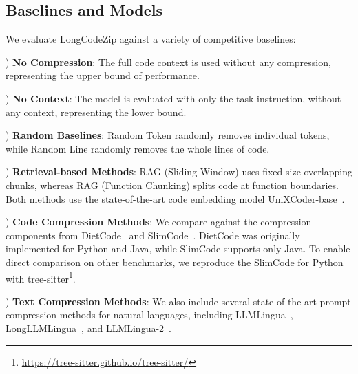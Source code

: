 \documentclass[10pt,conference]{IEEEtran}
\newcommand{\todo}[1]{{\textcolor{cyan}{\textbf{[TODO: #1]}}}}
\newcommand{\todoc}[2]{{\textcolor{#1}{\textbf{[#2]}}}}
\newcommand{\shi}[1]{\todoc{orange}{Shi: #1}}
\newcommand{\qian}[1]{\todoc{violet}{Qian: #1}}
\newcommand{\hy}[1]{\todoc{red}{HY: #1}}
\newcommand{\approach}{{LongCodeZip}\xspace} %
\begin{document}



\subsection{Baselines and Models}

We evaluate \approach against a variety of competitive baselines: 

) \textbf{No Compression}: The full code context is used without any compression, representing the upper bound of performance. 

) \textbf{No Context}: The model is evaluated with only the task instruction, without any context, representing the lower bound. 

) \textbf{Random Baselines}: Random Token randomly removes individual tokens, while Random Line randomly removes the whole lines of code. 

) \textbf{Retrieval-based Methods}: RAG (Sliding Window) uses fixed-size overlapping chunks, whereas RAG (Function Chunking) splits code at function boundaries. Both methods use the state-of-the-art code embedding model UniXCoder-base~\cite{guo2022unixcoder,zhang2023repocoder}. 

) \textbf{Code Compression Methods}: We compare against the compression components from DietCode~\cite{zhang2022diet} and SlimCode~\cite{wang2024natural}. DietCode was originally implemented for Python and Java, while SlimCode supports only Java. To enable direct comparison on other benchmarks, we reproduce the SlimCode for Python with tree-sitter\footnote{\url{https://tree-sitter.github.io/tree-sitter/}}. 

) \textbf{Text Compression Methods}: We also include several state-of-the-art prompt compression methods for natural languages, including LLMLingua~\cite{jiang2023llmlingua}, LongLLMLingua~\cite{jiang2024longllmlingua}, and LLMLingua-2~\cite{pan2024llmlingua}. 
\end{document}
